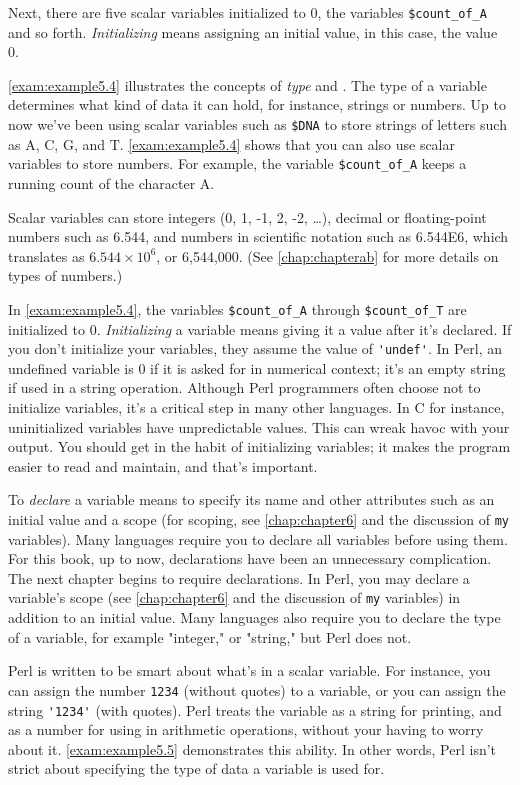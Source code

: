 Next, there are five scalar variables initialized to 0, the variables \verb|$count_of_A| and so forth. \textit{Initializing} means assigning an initial value, in this case, the value 0. 

\autoref{exam:example5.4} illustrates the concepts of \textit{type} and . The type of a variable determines what kind of data it can hold, for instance, strings or numbers. Up to now we've been using scalar variables such as \verb|$DNA| to store strings of letters such as A, C, G, and T. \autoref{exam:example5.4} shows that you can also use scalar variables to store numbers. For example, the variable \verb|$count_of_A| keeps a running count of the character A.

Scalar variables can store integers (0, 1, -1, 2, -2, \ldots), decimal or floating-point numbers such as 6.544, and numbers in scientific notation such as 6.544E6, which translates as $6.544 \times 10^6$, or 6,544,000. (See \autoref{chap:chapterab} for more details on types of numbers.)

In \autoref{exam:example5.4}, the variables \verb|$count_of_A| through \verb|$count_of_T| are initialized to 0. \textit{Initializing} a variable means giving it a value after it's declared. If you don't initialize your variables, they assume the value of \verb|'undef'|. In Perl, an undefined variable is 0 if it is asked for in numerical context; it's an empty string if used in a string operation. Although Perl programmers often choose not to initialize variables, it's a critical step in many other languages. In C for instance, uninitialized variables have unpredictable values. This can wreak havoc with your output. You should get in the habit of initializing variables; it makes the program easier to read and maintain, and that's important.

To \textit{declare} a variable means to specify its name and other attributes such as an initial value and a scope (for scoping, see \autoref{chap:chapter6} and the discussion of \verb|my| variables). Many languages require you to declare all variables before using them. For this book, up to now, declarations have been an unnecessary complication. The next chapter begins to require declarations. In Perl, you may declare a variable's scope (see \autoref{chap:chapter6} and the discussion of \verb|my| variables) in addition to an initial value.  Many languages also require you to declare the type of a variable, for example "integer," or "string," but Perl does not.

Perl is written to be smart about what's in a scalar variable. For instance, you can assign the number \verb|1234| (without quotes) to a variable, or you can assign the string \verb|'1234'| (with quotes). Perl treats the variable as a string for printing, and as a number for using in arithmetic operations, without your having to worry about it. \autoref{exam:example5.5} demonstrates this ability. In other words, Perl isn't strict about specifying the type of data a variable is used for. 

